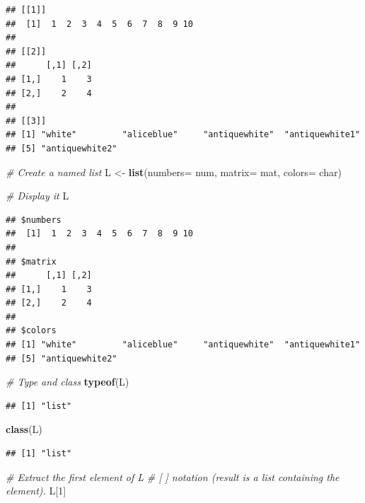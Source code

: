 \documentclass[
]{book}
\newenvironment{Shaded}{\begin{snugshade}}{\end{snugshade}}
\newcommand{\AttributeTok}[1]{\textcolor[rgb]{0.13,0.29,0.53}{#1}}
\newcommand{\CommentTok}[1]{\textcolor[rgb]{0.56,0.35,0.01}{\textit{#1}}}
\newcommand{\DecValTok}[1]{\textcolor[rgb]{0.00,0.00,0.81}{#1}}
\newcommand{\FunctionTok}[1]{\textcolor[rgb]{0.13,0.29,0.53}{\textbf{#1}}}
\newcommand{\NormalTok}[1]{#1}
\newcommand{\OtherTok}[1]{\textcolor[rgb]{0.56,0.35,0.01}{#1}}
\begin{document}
\begin{verbatim}
## [[1]]
##  [1]  1  2  3  4  5  6  7  8  9 10
## 
## [[2]]
##      [,1] [,2]
## [1,]    1    3
## [2,]    2    4
## 
## [[3]]
## [1] "white"         "aliceblue"     "antiquewhite"  "antiquewhite1"
## [5] "antiquewhite2"
\end{verbatim}

\begin{Shaded}
\begin{Highlighting}[]
\CommentTok{\# Create a named list}
\NormalTok{L }\OtherTok{\textless{}{-}} \FunctionTok{list}\NormalTok{(}\AttributeTok{numbers=}\NormalTok{ num, }\AttributeTok{matrix=}\NormalTok{ mat, }\AttributeTok{colors=}\NormalTok{ char)  }

\CommentTok{\# Display it}
\NormalTok{L}
\end{Highlighting}
\end{Shaded}

\begin{verbatim}
## $numbers
##  [1]  1  2  3  4  5  6  7  8  9 10
## 
## $matrix
##      [,1] [,2]
## [1,]    1    3
## [2,]    2    4
## 
## $colors
## [1] "white"         "aliceblue"     "antiquewhite"  "antiquewhite1"
## [5] "antiquewhite2"
\end{verbatim}

\begin{Shaded}
\begin{Highlighting}[]
\CommentTok{\# Type and class}
\FunctionTok{typeof}\NormalTok{(L)}
\end{Highlighting}
\end{Shaded}

\begin{verbatim}
## [1] "list"
\end{verbatim}

\begin{Shaded}
\begin{Highlighting}[]
\FunctionTok{class}\NormalTok{(L)}
\end{Highlighting}
\end{Shaded}

\begin{verbatim}
## [1] "list"
\end{verbatim}

\begin{Shaded}
\begin{Highlighting}[]
\CommentTok{\# Extract the first element of L}
\CommentTok{\# [ ] notation (result is a list containing the element).}
\NormalTok{L[}\DecValTok{1}\NormalTok{]}
\end{Highlighting}
\end{Shaded}
\end{document}
